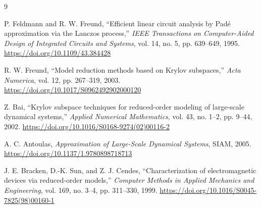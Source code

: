 \documentclass[UTF8,a4paper,11pt]{ctexart}
\begin{document}
\begin{thebibliography}{9}

P. Feldmann and R. W. Freund,
``Efficient linear circuit analysis by Padé approximation via the Lanczos process,''
\emph{IEEE Transactions on Computer-Aided Design of Integrated Circuits and Systems},
vol. 14, no. 5, pp. 639--649, 1995.
\url{https://doi.org/10.1109/43.384428}

R. W. Freund,
``Model reduction methods based on Krylov subspaces,''
\emph{Acta Numerica},
vol. 12, pp. 267--319, 2003.
\url{https://doi.org/10.1017/S0962492902000120}

Z. Bai,
``Krylov subspace techniques for reduced-order modeling of large-scale dynamical systems,''
\emph{Applied Numerical Mathematics},
vol. 43, no. 1--2, pp. 9--44, 2002.
\url{https://doi.org/10.1016/S0168-9274(02)00116-2}

A. C. Antoulas,
\emph{Approximation of Large-Scale Dynamical Systems},
SIAM, 2005.
\url{https://doi.org/10.1137/1.9780898718713}

J. E. Bracken, D.-K. Sun, and Z. J. Cendes,
``Characterization of electromagnetic devices via reduced-order models,''
\emph{Computer Methods in Applied Mechanics and Engineering},
vol. 169, no. 3--4, pp. 311--330, 1999.
\url{https://doi.org/10.1016/S0045-7825(98)00160-1}

\end{thebibliography}
\end{document}
